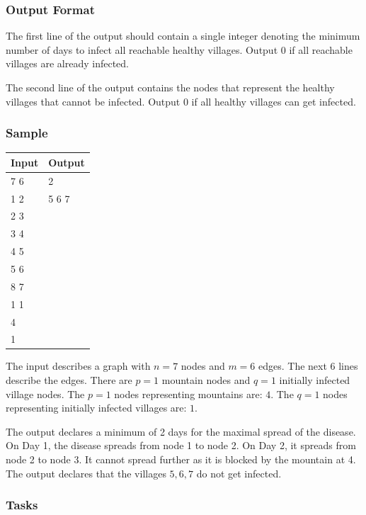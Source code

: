 \documentclass[a4paper]{exam}
\newcommand\heading[1]{\subsubsection*{#1}}
\begin{document}
\begin{questions}
\heading{Output Format}

The first line of the output should contain a single integer denoting the minimum number of days to infect all reachable healthy villages. Output 0 if all reachable villages are already infected.

The second line of the output contains the nodes that represent the healthy villages that cannot be infected. Output 0 if all healthy villages can get infected.

\heading{Sample}
\begin{minipage}{.2\textwidth}
\begin{tabular}{|l|l|}
  \hline
  Input & Output\\\hline
7 6 & 2 \\
1 2 & 5 6 7\\
2 3 & \\
3 4 & \\
4 5 & \\
5 6 & \\
8 7 & \\
1 1 & \\
4 & \\
1 & \\\hline
\end{tabular}
\end{minipage}
\begin{minipage}{.75\textwidth}
The input describes a graph with $n=7$ nodes and $m=6$ edges. The next 6 lines describe the edges. There are $p=1$ mountain nodes and $q=1$ initially infected village nodes. The $p=1$ nodes representing mountains are: $4$. The $q=1$ nodes representing initially infected villages are: $1$.

The output declares a minimum of 2 days for the maximal spread of the disease. On Day 1, the disease spreads from node 1 to node 2. On Day 2, it spreads from node 2 to node 3. It cannot spread further as it is blocked by the mountain at 4. The output declares that the villages $5, 6, 7$ do not get infected.
\end{minipage}

\heading{Tasks}

\end{questions}
\end{document}
